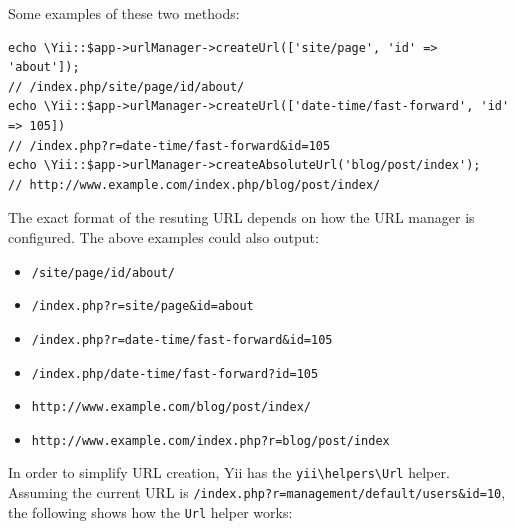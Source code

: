 Some examples of these two methods:

\lstset{language=php}\begin{lstlisting}
echo \Yii::$app->urlManager->createUrl(['site/page', 'id' => 'about']);
// /index.php/site/page/id/about/
echo \Yii::$app->urlManager->createUrl(['date-time/fast-forward', 'id' => 105])
// /index.php?r=date-time/fast-forward&id=105
echo \Yii::$app->urlManager->createAbsoluteUrl('blog/post/index');
// http://www.example.com/index.php/blog/post/index/
\end{lstlisting}
The exact format of the resuting URL depends on how the URL manager is configured. The above
examples could also output:

\begin{itemize}
\item \lstinline|/site/page/id/about/|
\item \lstinline|/index.php?r=site/page&id=about|
\item \lstinline|/index.php?r=date-time/fast-forward&id=105|
\item \lstinline|/index.php/date-time/fast-forward?id=105|
\item \lstinline|http://www.example.com/blog/post/index/|
\item \lstinline|http://www.example.com/index.php?r=blog/post/index|
\end{itemize}
In order to simplify URL creation, Yii has the \texttt{yii{\allowbreak{}\textbackslash}helpers{\allowbreak{}\textbackslash}Url} helper. Assuming the current URL is \lstinline|/index.php?r=management/default/users&id=10|, the following
shows how the \lstinline|Url| helper works:

